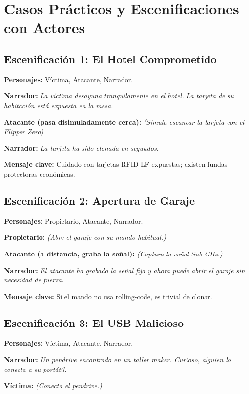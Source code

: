 \documentclass[a4paper,12pt]{article}
\begin{document}
\section{Casos Prácticos y Escenificaciones con Actores}

\subsection*{Escenificación 1: El Hotel Comprometido}

\textbf{Personajes:} Víctima, Atacante, Narrador.

\textbf{Narrador:} 
\textit{La víctima desayuna tranquilamente en el hotel. La tarjeta de su habitación está expuesta en la mesa.}

\textbf{Atacante (pasa disimuladamente cerca):}
\textit{(Simula escanear la tarjeta con el Flipper Zero)}

\textbf{Narrador:} 
\textit{La tarjeta ha sido clonada en segundos.}

\textbf{Mensaje clave:} Cuidado con tarjetas RFID LF expuestas; existen fundas protectoras económicas.

\subsection*{Escenificación 2: Apertura de Garaje}

\textbf{Personajes:} Propietario, Atacante, Narrador.

\textbf{Propietario:} 
\textit{(Abre el garaje con su mando habitual.)}

\textbf{Atacante (a distancia, graba la señal):}
\textit{(Captura la señal Sub-GHz.)}

\textbf{Narrador:} 
\textit{El atacante ha grabado la señal fija y ahora puede abrir el garaje sin necesidad de fuerza.}

\textbf{Mensaje clave:} Si el mando no usa rolling-code, es trivial de clonar.

\subsection*{Escenificación 3: El USB Malicioso}

\textbf{Personajes:} Víctima, Atacante, Narrador.

\textbf{Narrador:} 
\textit{Un pendrive encontrado en un taller maker. Curioso, alguien lo conecta a su portátil.}

\textbf{Víctima:} 
\textit{(Conecta el pendrive.)}
\end{document}
